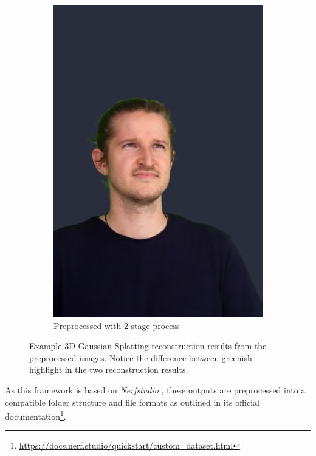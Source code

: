 \begin{figure}[h]
	\begin{subfigure}{0.4\linewidth}
		\includegraphics[width=\textwidth]{Figures/processed/2stage_ex.png}
		\caption{Preprocessed with 2 stage process}
	\end{subfigure}
	\caption{Example 3D Gaussian Splatting reconstruction results from the preprocessed images. Notice the difference between greenish highlight in the two reconstruction results.}
	\label{fig:preprocessing_example}

\end{figure}

As this framework is based on \textit{Nerfstudio} \citep{Tancik.2023}, these outputs are preprocessed into a compatible folder structure and file formats as outlined in its official documentation\footnote{\url{https://docs.nerf.studio/quickstart/custom_dataset.html}}.

